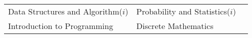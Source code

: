 

{\fontsize{11pt}{1em}\bodyfontlight\upshape\color{text}
  \begin{tabular*}{\textwidth}{L{\textwidth/3 - 1cm} L{\textwidth/3 -1cm} R{\textwidth/3 -1cm}}
  Data Structures and Algorithm($i$) & Probability and Statistics($i$) & \\
  Introduction to Programming &  Discrete Mathematics \\
\end{tabular*}
}


